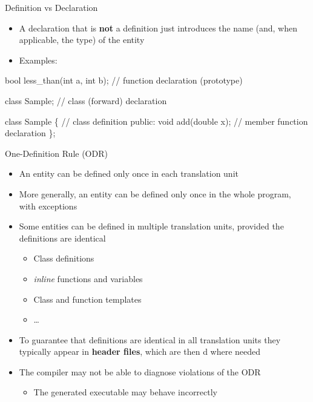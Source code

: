 \begin{frame}[fragile]{Definition vs Declaration \insertcontinuationtext}

  \begin{itemize}
  \item A \alert{declaration} that is \textbf{not} a definition just introduces
    the name (and, when applicable, the type) of the entity
  \item Examples:
  \end{itemize}

  \begin{codeblock}{
bool less_than(int a, int b); // function declaration (prototype)

class Sample; // class (forward) declaration

class Sample \{ // class definition
 public:
  void add(double x); // member function declaration
  \ddd
\};
}\end{codeblock}

\end{frame}

\begin{frame}{One-Definition Rule (ODR)}
  \begin{itemize}[<+->]
  \item An entity can be defined only once in each translation unit
  \item More generally, an entity can be defined only once in the whole program,
    with exceptions
  \item Some entities can be defined in multiple translation units, provided the
    definitions are identical
    \begin{itemize}[<.->]
    \item Class definitions
    \item \textit{inline} functions and variables
    \item Class and function templates
    \item \ldots
    \end{itemize}
  \item To guarantee that definitions are identical in all translation units
    they typically appear in \textbf{header files}, which are then
    d where needed
  \item The compiler may not be able to diagnose violations of the ODR
    \begin{itemize}
    \item The generated executable may behave incorrectly
    \end{itemize}
  \end{itemize}
\end{frame}

